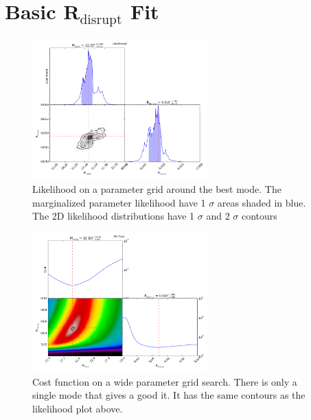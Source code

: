 \documentclass[twocolumn]{article}
\begin{document}
\clearpage


\section{Basic R$_{\mathrm{disrupt}}$ Fit}

\begin{figure}[H]
  \center\includegraphics[width=0.6\textwidth]{figs/cfn/basic_rd.param/calc_likelihood_bounds.py/fig1.png}
  \caption{Likelihood on a parameter grid around the best mode. The marginalized parameter likelihood have
    1 $\sigma$ areas shaded in blue. The 2D likelihood distributions have 1 $\sigma$  and 2 $\sigma$ contours}
  \label{fig:basic_rd:likelihood}
\end{figure}

\begin{figure}[H]
  \center\includegraphics[width=0.6\textwidth]{figs/cfn/basic_rd_wide.param/calc_likelihood_bounds.py/fig2.png}
  \caption{Cost function on a wide parameter grid search. There is only a single mode that gives a good it. It has the same
  contours as the likelihood plot above.}
  \label{fig:basic_rd:cost}
\end{figure}
\end{document}
